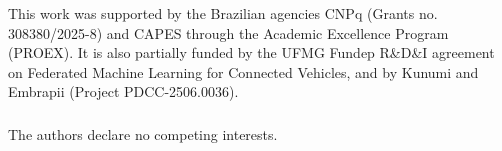 \documentclass[runningheads]{llncs}
\begin{document}
\begin{credits}
\subsubsection{\ackname} This work was supported by the Brazilian agencies CNPq (Grants no. 308380/2025-8) and CAPES through the Academic Excellence Program (PROEX). It is also partially funded by the UFMG Fundep R\&D\&I agreement on Federated Machine Learning for Connected Vehicles, and by Kunumi and Embrapii (Project PDCC-2506.0036).

\subsubsection{\discintname}
The authors declare no competing interests.
\end{credits}



\end{document}
